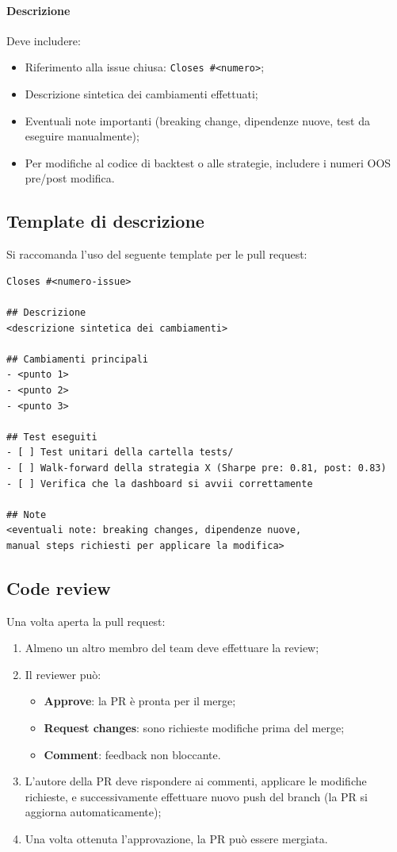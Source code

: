 \paragraph{Descrizione} Deve includere:
\begin{itemize}
  \item Riferimento alla issue chiusa: \texttt{Closes \#<numero>};
  \item Descrizione sintetica dei cambiamenti effettuati;
  \item Eventuali note importanti (breaking change, dipendenze nuove, test da eseguire manualmente);
  \item Per modifiche al codice di backtest o alle strategie, includere i numeri OOS pre/post modifica.
\end{itemize}

\subsection{Template di descrizione}

Si raccomanda l'uso del seguente template per le pull request:

\begin{lstlisting}
Closes #<numero-issue>

## Descrizione
<descrizione sintetica dei cambiamenti>

## Cambiamenti principali
- <punto 1>
- <punto 2>
- <punto 3>

## Test eseguiti
- [ ] Test unitari della cartella tests/
- [ ] Walk-forward della strategia X (Sharpe pre: 0.81, post: 0.83)
- [ ] Verifica che la dashboard si avvii correttamente

## Note
<eventuali note: breaking changes, dipendenze nuove,
manual steps richiesti per applicare la modifica>
\end{lstlisting}

\subsection{Code review}

Una volta aperta la pull request:

\begin{enumerate}
  \item Almeno un altro membro del team deve effettuare la review;
  \item Il reviewer può:
  \begin{itemize}
    \item \textbf{Approve}: la PR è pronta per il merge;
    \item \textbf{Request changes}: sono richieste modifiche prima del merge;
    \item \textbf{Comment}: feedback non bloccante.
  \end{itemize}
  \item L'autore della PR deve rispondere ai commenti, applicare le modifiche richieste, e successivamente effettuare nuovo push del branch (la PR si aggiorna automaticamente);
  \item Una volta ottenuta l'approvazione, la PR può essere mergiata.
\end{enumerate}

